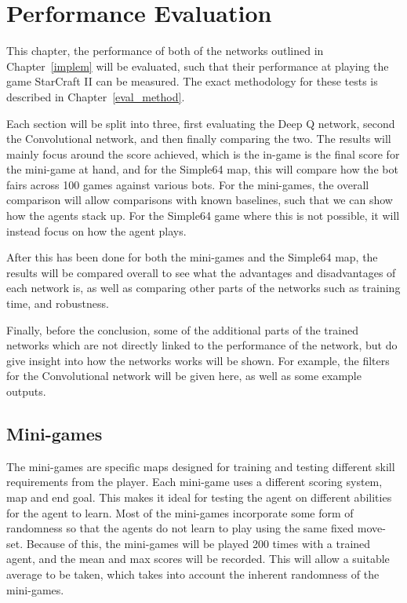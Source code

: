 \chapter{Performance Evaluation}%
\label{eval}

This chapter, the performance of both of the networks outlined in
Chapter~\ref{implem} will be evaluated, such that their performance at playing
the game StarCraft II can be measured. The exact methodology for these tests is
described in Chapter~\ref{eval_method}.

Each section will be split into three, first evaluating the Deep Q network,
second the Convolutional network, and then finally comparing the two. The
results will mainly focus around the score achieved, which is the in-game is the
final score for the mini-game at hand, and for the Simple64 map, this will
compare how the bot fairs across 100 games against various bots. For the
mini-games, the overall comparison will allow comparisons with known baselines,
such that we can show how the agents stack up. For the Simple64 game where this
is not possible, it will instead focus on how the agent plays.

After this has been done for both the mini-games and the Simple64 map, the
results will be compared overall to see what the advantages and disadvantages of
each network is, as well as comparing other parts of the networks such as
training time, and robustness.

Finally, before the conclusion, some of the additional parts of the trained
networks which are not directly linked to the performance of the network, but
do give insight into how the networks works will be shown. For example, the
filters for the Convolutional network will be given here, as well as some
example outputs.

\section{Mini-games}

The mini-games are specific maps designed for training and testing different
skill requirements from the player. Each mini-game uses a different scoring
system, map and end goal. This makes it ideal for testing the agent on different
abilities for the agent to learn. Most of the mini-games incorporate some form
of randomness so that the agents do not learn to play using the same fixed
move-set. Because of this, the mini-games will be played 200 times with a
trained agent, and the mean and max scores will be recorded. This will allow a
suitable average to be taken, which takes into account the inherent randomness
of the mini-games.

